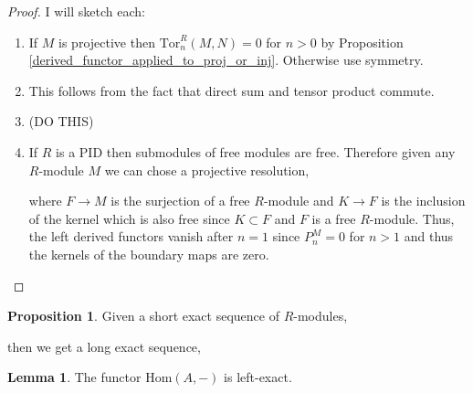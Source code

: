 \documentclass[12pt]{article}
\newcommand{\Tor}[4]{\mathrm{Tor}^{#1}_{#2} \left( #3, #4 \right)}
\newcommand{\Hom}[2]{\mathrm{Hom}\left(#1, #2 \right)}
\theoremstyle{remark}
\theoremstyle{definition}
\newtheorem{lemma}[theorem]{Lemma}
\newtheorem{proposition}[theorem]{Proposition}
\begin{document}
\begin{proof}
I will sketch each:
\begin{enumerate}
\item If $M$ is projective then $\Tor{R}{n}{M}{N} = 0$ for $n > 0$ by Proposition \ref{derived_functor_applied_to_proj_or_inj}. Otherwise use symmetry.

\item This follows from the fact that direct sum and tensor product commute.

\item (DO THIS)

\item If $R$ is a PID then submodules of free modules are free. Therefore given any $R$-module $M$ we can chose a projective resolution,
\begin{center}
\end{center}
where $F \to M$ is the surjection of a free $R$-module and $K \to F$ is the inclusion of the kernel which is also free since $K \subset F$ and $F$ is a free $R$-module. Thus, the left derived functors vanish after $n = 1$ since $P^M_n = 0$ for $n > 1$ and thus the kernels of the boundary maps are zero.
\end{enumerate} 
\end{proof}

\begin{proposition}
Given a short exact sequence of $R$-modules,
\begin{center}
\end{center}
then we get a long exact sequence,
\begin{center}
\end{center} 
\end{proposition}

\begin{lemma}
The functor $\Hom{A}{-}$ is left-exact.
\end{lemma}
\end{document}
